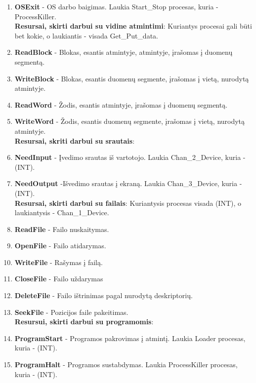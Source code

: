 		\begin{enumerate}
			\item \textbf{OSExit} - OS darbo baigimas. Laukia Start\_Stop procesas, kuria - ProcessKiller. \\
			
			\textbf{Resursai, skirti darbui su vidine atmintimi}: Kuriantys procesai gali būti bet kokie, o laukiantis - visada Get\_Put\_data.
			
			\item \textbf{ReadBlock} - Blokas, esantis atmintyje, atmintyje, įrašomas į duomenų segmentą.
			\item \textbf{WriteBlock} - Blokas, esantis duomenų segmente, įrašomas į vietą, nurodytą atmintyje.
			\item \textbf{ReadWord} - Žodis, esantis atmintyje, įrašomas į duomenų segmentą.
			\item \textbf{WriteWord} - Žodis, esantis duomenų segmente, įrašomas į vietą, nurodytą atmintyje.\\
			
			\textbf{Resursai, skriti darbui su srautais}:
			
			\item \textbf{NeedInput} - Įvedimo srautas iš vartotojo. Laukia Chan\_2\_Device, kuria - (INT). 
			\item \textbf{NeedOutput} -Išvedimo srautas į ekraną.
			Laukia Chan\_3\_Device, kuria - (INT).\\
			
			\textbf{Resursai, skirti darbui su failais}: Kuriantysis procesas visada (INT), o laukiantysis - Chan\_1\_Device.
			
			\item \textbf{ReadFile} - Failo nuskaitymas.
			\item \textbf{OpenFile} - Failo atidarymas.
			\item \textbf{WriteFile} - Rašymas į failą.
			\item \textbf{CloseFile} - Failo uždarymas
			\item \textbf{DeleteFile} - Failo ištrinimas pagal nurodytą deskriptorių.
			\item \textbf{SeekFile} - Pozicijos faile pakeitimas.\\
			
			\textbf{Resursui, skirti darbui su programomis}:
			
			\item \textbf{ProgramStart} - Programos pakrovimas į atmintį. Laukia Loader procesas, kuria - (INT).
			\item \textbf{ProgramHalt} - Programos sustabdymas. Laukia ProcessKiller procesas, kuria - (INT).
			
		\end{enumerate}
		
